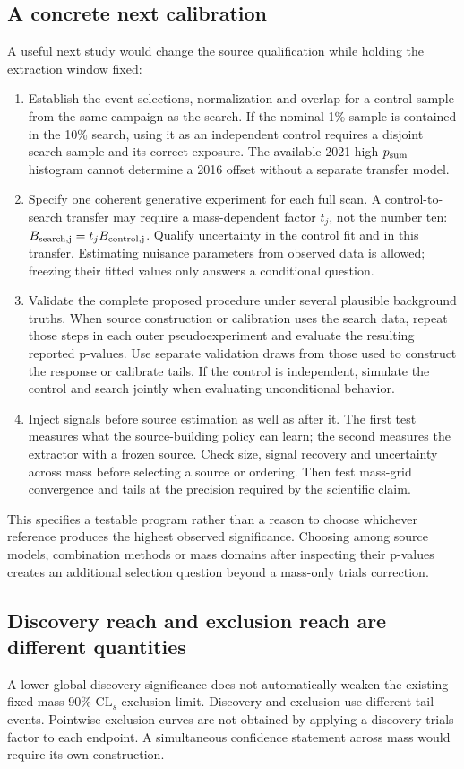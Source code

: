 \subsection{A concrete next calibration}
A useful next study would change the source qualification while holding the extraction window fixed:
\begin{enumerate}
\item Establish the event selections, normalization and overlap for a control sample from the same campaign as the search. If the nominal 1\% sample is contained in the 10\% search, using it as an independent control requires a disjoint search sample and its correct exposure. The available 2021 high-$p_{\rm sum}$ histogram cannot determine a 2016 offset without a separate transfer model.
\item Specify one coherent generative experiment for each full scan. A control-to-search transfer may require a mass-dependent factor $t_j$, not the number ten: $B_{\rm search,j}=t_j B_{\rm control,j}$. Qualify uncertainty in the control fit and in this transfer. Estimating nuisance parameters from observed data is allowed; freezing their fitted values only answers a conditional question.
\item Validate the complete proposed procedure under several plausible background truths. When source construction or calibration uses the search data, repeat those steps in each outer pseudoexperiment and evaluate the resulting reported p-values. Use separate validation draws from those used to construct the response or calibrate tails. If the control is independent, simulate the control and search jointly when evaluating unconditional behavior.
\item Inject signals before source estimation as well as after it. The first test measures what the source-building policy can learn; the second measures the extractor with a frozen source. Check size, signal recovery and uncertainty across mass before selecting a source or ordering. Then test mass-grid convergence and tails at the precision required by the scientific claim.
\end{enumerate}
This specifies a testable program rather than a reason to choose whichever reference produces the highest observed significance. Choosing among source models, combination methods or mass domains after inspecting their p-values creates an additional selection question beyond a mass-only trials correction.

\subsection{Discovery reach and exclusion reach are different quantities}
A lower global discovery significance does not automatically weaken the existing fixed-mass 90\% CL$_s$ exclusion limit. Discovery and exclusion use different tail events\cite{Cowan}. Pointwise exclusion curves are not obtained by applying a discovery trials factor to each endpoint. A simultaneous confidence statement across mass would require its own construction.

